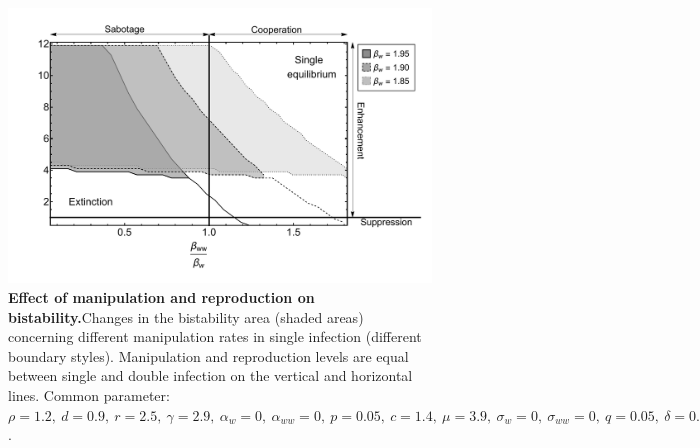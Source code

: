 \documentclass[11pt]{article}
\begin{document}
\begin{figure}[!ht]
	\includegraphics[width=\textwidth]{Figures/ratio_reproduction_manipulation_beta.pdf}
	\caption{\textbf{Effect of manipulation and reproduction on bistability.}Changes in the bistability area (shaded areas) concerning different manipulation rates in single infection (different boundary styles). 
			Manipulation and reproduction levels are equal between single and double infection on the vertical and horizontal lines. 
			Common parameter:  $\rho = 1.2, \ d = 0.9, \ r = 2.5, \ \gamma = 2.9, \ \alpha_w = 0, \ \alpha_{ww} = 0, \ p = 0.05, \ c = 1.4, \ \mu = 3.9, \ \sigma_w = 0, \ \sigma_{ww} = 0, \ q = 0.05, \ \delta = 0.9, \ k = 0.26, \  f_w = 35, h = 0.6$.} 
	\end{figure}

\clearpage



\end{document}
